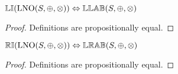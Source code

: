 \begin{theorem} \label{thm:blno_left_increasing}
${\mathbb{LI}}(\mathrm{LNO}(S,\oplus,\otimes)) \Leftrightarrow {\mathbb{LLAB}}(S,\oplus,\otimes)$
\end{theorem}

\begin{proof}

\vspace{0.5em}
Definitions are propositionally equal.
\end{proof}






\begin{theorem} \label{thm:blno_right_increasing}
${\mathbb{RI}}(\mathrm{LNO}(S,\oplus,\otimes)) \Leftrightarrow {\mathbb{LRAB}}(S,\oplus,\otimes)$
\end{theorem}

\begin{proof}

\vspace{0.5em}
Definitions are propositionally equal.
\end{proof}

